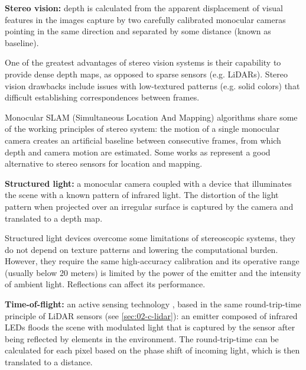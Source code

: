 \textbf{Stereo vision:} depth is calculated \cite{Hamzah2016} from the 
apparent displacement of visual features in the images capture by two 
carefully calibrated monocular cameras pointing in the same direction and
separated by some distance (known as baseline). 
            
One of the greatest advantages of stereo vision systems is their capability 
to provide dense depth maps, as opposed to sparse sensors (e.g. LiDARs).  
Stereo vision drawbacks include issues with low-textured patterns 
(e.g. solid colors) that difficult establishing correspondences between
frames.

Monocular SLAM (Simultaneous Location And Mapping) algorithms share some of the
working principles of stereo system: the motion of a single monocular camera 
creates an artificial baseline between consecutive frames, from which depth and
camera motion are estimated.
Some works as \cite{Engel2014}\cite{Engel2018} represent a good alternative to
stereo sensors for location and mapping. 
    
\textbf{Structured light:} a monocular camera coupled with a device that
illuminates the scene with a known pattern of infrared light. 
The distortion of the light pattern when projected over an irregular 
surface is captured by the camera and translated to a depth map.

Structured light devices overcome some limitations of stereoscopic systems,
they do not depend on texture patterns and lowering the computational burden. 
However, they require the same high-accuracy calibration \cite{Garbat2013}
and its operative range (usually below 20 meters) is limited by the power of
the emitter and the intensity of ambient light. Reflections can affect its
performance.


\textbf{Time-of-flight:} an active sensing technology 
\cite{Hansard2013}, based in the same round-trip-time principle 
of LiDAR sensors (see \ref{sec:02-c-lidar}): an emitter composed of infrared 
LEDs floods the scene with modulated light that is captured by the sensor after
being reflected by elements in the environment. 
The round-trip-time can be calculated for each pixel based on the phase shift 
of incoming light, which is then translated to a distance.

